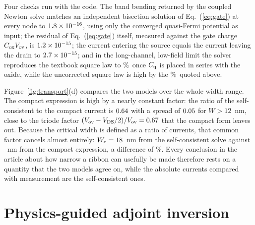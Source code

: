 \documentclass[aip,apl,amsmath,amssymb,reprint,longbibliography]{revtex4-1}
\begin{document}
Four checks run with the code. The band bending returned by the coupled Newton
solve matches an independent bisection solution of Eq.~(\ref{eq:gate}) at every
node to $1.8\times 10^{-16}$, using only the converged quasi-Fermi potential as input;
the residual of Eq.~(\ref{eq:gate}) itself, measured against the gate charge
$C_{\rm ox}V_{\rm ov}$, is $1.2\times 10^{-15}$; the current entering the source equals
the current leaving the drain to $2.7\times 10^{-15}$; and in the long-channel,
low-field limit the solver reproduces the textbook square law to
\ScSquareErr\%\ once $C_{\rm q}$ is placed in series with the oxide, while the
uncorrected square law is high by the \ScCqCorr\%\ quoted above.

Figure~\ref{fig:transport}(d) compares the two models over the whole width
range. The compact expression is high by a nearly constant factor: the ratio of
the self-consistent to the compact current is $0.64$ with a spread of
$0.05$ for $W>12$~nm, close to the triode factor
$(V_{\rm ov}-V_{\rm DS}/2)/V_{\rm ov}=0.67$ that the compact form leaves out.
Because the critical width is defined as a ratio of currents, that common
factor cancels almost entirely: $W_{\rm c}=18$~nm from the
self-consistent solve against \WcCompact~nm from the compact expression, a
difference of \WcModelDiff\%. Every conclusion in the article about how narrow a
ribbon can usefully be made therefore rests on a quantity that the two models
agree on, while the absolute currents compared with measurement are the
self-consistent ones.

\section{Physics-guided adjoint inversion}
\label{sec:adjoint}
\end{document}
